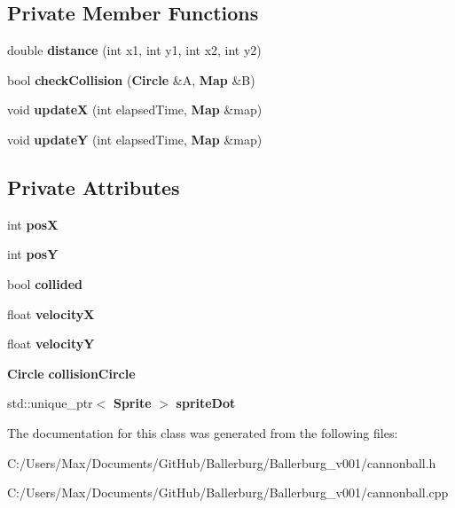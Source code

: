 \subsection*{Private Member Functions}
\begin{DoxyCompactItemize}
\item 
double {\bfseries distance} (int x1, int y1, int x2, int y2)\label{class_cannonball_a9e297db446a0a85cf11459b657d26125}

\item 
bool {\bfseries check\+Collision} ({\bf Circle} \&A, {\bf Map} \&B)\label{class_cannonball_a782b1293862fe31273c7de1941e8544a}

\item 
void {\bfseries update\+X} (int elapsed\+Time, {\bf Map} \&map)\label{class_cannonball_aeb159591227b193a1d78f663fc807653}

\item 
void {\bfseries update\+Y} (int elapsed\+Time, {\bf Map} \&map)\label{class_cannonball_a72f41a02fe2101abd082dbb6567715ef}

\end{DoxyCompactItemize}
\subsection*{Private Attributes}
\begin{DoxyCompactItemize}
\item 
int {\bfseries pos\+X}\label{class_cannonball_a36aac6eec38415bb074c09e66cf24f1f}

\item 
int {\bfseries pos\+Y}\label{class_cannonball_a27def66b928e564d5bac7382c66ae5a5}

\item 
bool {\bfseries collided}\label{class_cannonball_a0794a8ae61dc67fab82fcbc24d580100}

\item 
float {\bfseries velocity\+X}\label{class_cannonball_ac384c351b9621cd16ebbd980ba37404d}

\item 
float {\bfseries velocity\+Y}\label{class_cannonball_a0275fa75787a8ddc9e4decead6201a27}

\item 
{\bf Circle} {\bfseries collision\+Circle}\label{class_cannonball_abae8e9805e8931bcbe6d5c83d9dd0a27}

\item 
std\+::unique\+\_\+ptr$<$ {\bf Sprite} $>$ {\bfseries sprite\+Dot}\label{class_cannonball_a90ddfd584ef92517b2ca3d1de600a7e6}

\end{DoxyCompactItemize}


The documentation for this class was generated from the following files\+:\begin{DoxyCompactItemize}
\item 
C\+:/\+Users/\+Max/\+Documents/\+Git\+Hub/\+Ballerburg/\+Ballerburg\+\_\+v001/cannonball.\+h\item 
C\+:/\+Users/\+Max/\+Documents/\+Git\+Hub/\+Ballerburg/\+Ballerburg\+\_\+v001/cannonball.\+cpp\end{DoxyCompactItemize}
